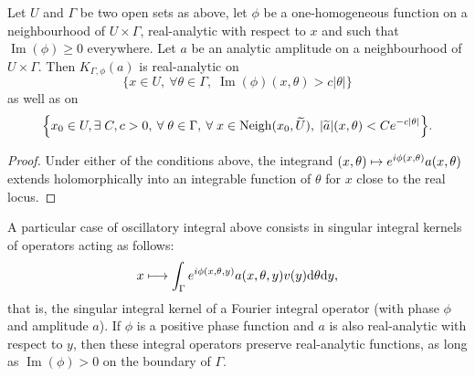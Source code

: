 \documentclass[AHL,Unicode,longabstracts,published]{cedram}
\DeclareMathOperator{\im}{Im}
\DeclareMathOperator{\Neigh}{Neigh}
\newcommand\1{\mathds{1}}
\newcommand{\dd}{\mathrm{d}}
\let\oldexists\exists
\renewcommand*{\exists}{\mathrel{\oldexists}}
\let\oldforall\forall
\renewcommand*{\forall}{\mathrel{\oldforall}}
\let\oldmapsto\mapsto
\renewcommand*{\mapsto}{\mathchoice{\longmapsto}{\oldmapsto}{\oldmapsto}{\oldmapsto}}
\let\originalleft\left
\let\originalright\right
\renewcommand{\left}{\mathopen{}\mathclose\bgroup\originalleft}
\renewcommand{\right}{\aftergroup\egroup\originalright}
\begin{document}
\begin{prop}\label{prop:pos_phase_reg_int}
Let $U$ and $\Gamma$ be two open sets as above, let $\phi$ be a one-homogeneous function on a neighbourhood of $U\times \Gamma$, real-analytic with respect to $x$ and such that $\im(\phi)\geq 0$ everywhere. Let $a$ be an analytic amplitude on a neighbourhood of $U\times \Gamma$. Then $K_{\Gamma,\phi}(a)$ is real-analytic on
\[
\{x\in U, \:\forall \theta\in \Gamma,\;
\im(\phi)(x,\theta)>c|\theta|\}
\]
as well as on
\[
\left\{x_0\in U, \exists C,c>0,\:\forall \theta\in \Gamma,\: \forall x\in \Neigh(x_0,\widetilde{U}),\; |\widetilde{a}|(x,\theta)<Ce^{-c|\theta|}\right\}.
\]
\end{prop}
\begin{proof}
Under either of the conditions above, the integrand $(x,\theta)\mapsto e^{i\phi(x,\theta)}a(x,\theta)$ extends holomorphically into an integrable function of $\theta$ for $x$ close to the real locus.
\end{proof}

A particular case of oscillatory integral above consists in singular integral kernels of operators acting as follows:
\begin{equation}\label{eq:local_FIO}
x\mapsto \int_{\Gamma} e^{i\phi(x,\theta,y)}a(x,\theta,y)v(y)\dd \theta \dd y,
\end{equation}
that is, the singular integral kernel of a Fourier integral operator (with phase $\phi$ and amplitude $a$). If $\phi$ is a positive phase function and $a$ is also real-analytic with respect to $y$, then these integral operators preserve real-analytic functions, as long as $\im(\phi)>0$ on the boundary of $\Gamma$.
\end{document}
